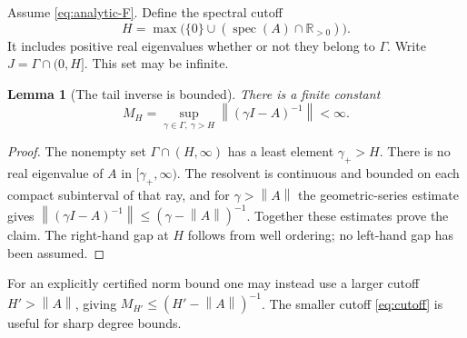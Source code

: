 \documentclass[11pt,a4paper]{article}
\numberwithin{equation}{section}
\newtheorem{lemma}[theorem]{Lemma}
\theoremstyle{definition}
\theoremstyle{remark}
\newcommand{\R}{\mathbb R}
\newcommand{\G}{\Gamma}
\newcommand{\spec}{\operatorname{spec}}
\newcommand{\norm}[1]{\left\lVert #1\right\rVert}
\begin{document}
Assume \eqref{eq:analytic-F}. Define the spectral cutoff
\begin{equation}\label{eq:cutoff}
 H=\max\bigl(\{0\}\cup(\spec(A)\cap\R_{>0})\bigr).
\end{equation}
It includes positive real eigenvalues whether or not they belong to $\G$.
Write $J=\G\cap(0,H]$. This set may be infinite.

\begin{lemma}[The tail inverse is bounded]\label{lem:tail-inverse}
There is a finite constant
\begin{equation}\label{eq:tail-M}
 M_H=\sup_{\gamma\in\G,\ \gamma>H}\norm{(\gamma I-A)^{-1}}<\infty.
\end{equation}
\end{lemma}
\begin{proof}
The nonempty set $\G\cap(H,\infty)$ has a least element $\gamma_+>H$.
There is no real eigenvalue of $A$ in $[\gamma_+,\infty)$.
The resolvent is continuous and bounded on each compact subinterval of
that ray, and for $\gamma>\norm A$ the geometric-series estimate gives
$\norm{(\gamma I-A)^{-1}}\leq(\gamma-\norm A)^{-1}$.
Together these estimates prove the claim. The right-hand gap at $H$ follows
from well ordering; no left-hand gap has been assumed.
\end{proof}

For an explicitly certified norm bound one may instead use a larger cutoff
$H'>\norm A$, giving $M_{H'}\leq(H'-\norm A)^{-1}$.
The smaller cutoff \eqref{eq:cutoff} is useful for sharp degree bounds.
\end{document}
